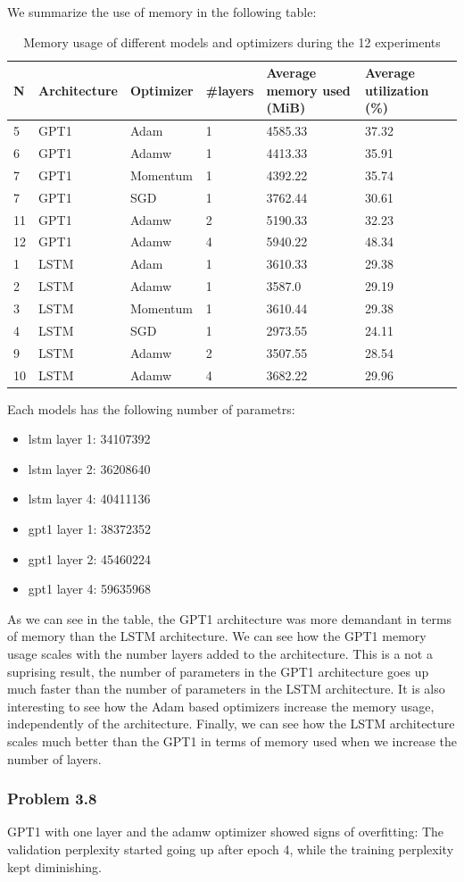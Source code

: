\documentclass[12pt]{article}
\theoremstyle{definition}
\begin{document}
We summarize the use of memory in the following table:
\begin{table}[H]
\begin{tabular}{llllll}
\hline
\multicolumn{1}{|l|}{N} & \multicolumn{1}{l|}{Architecture} & \multicolumn{1}{l|}{Optimizer} & \multicolumn{1}{l|}{\#layers} & \multicolumn{1}{l|}{Average memory used (MiB)} & \multicolumn{1}{l|}{Average utilization (\%)} \\ \hline
5 & GPT1 & Adam & 1 & 4585.33 & 37.32 \\
6 & GPT1 & Adamw & 1 & 4413.33 & 35.91 \\
7 & GPT1 & Momentum & 1 & 4392.22 & 35.74 \\
7 & GPT1 & SGD & 1 & 3762.44 & 30.61 \\
11 & GPT1 & Adamw & 2 & 5190.33 & 32.23 \\
12 & GPT1 & Adamw & 4 & 5940.22 & 48.34 \\
1 & LSTM & Adam & 1 & 3610.33 & 29.38 \\
2 & LSTM & Adamw & 1 & 3587.0 & 29.19 \\
3 & LSTM & Momentum & 1 & 3610.44 & 29.38 \\
4 & LSTM & SGD & 1 & 2973.55 & 24.11 \\
9 & LSTM & Adamw & 2 & 3507.55 & 28.54 \\
10 & LSTM & Adamw & 4 & 3682.22 & 29.96
\end{tabular}
\caption{Memory usage of different models and optimizers during the 12 experiments}
\end{table}
Each models has the following number of parametrs:
\begin{itemize}
    \item lstm layer 1: 34107392
    \item lstm layer 2: 36208640
    \item lstm layer 4: 40411136
    \item gpt1 layer 1: 38372352
    \item gpt1 layer 2: 45460224
    \item gpt1 layer 4: 59635968
\end{itemize}
As we can see in the table, the GPT1 architecture was more demandant in terms of
memory than the LSTM architecture. We can see how the GPT1 memory usage scales
with the number layers added to the architecture. This is a not a suprising
result, the number of parameters in the GPT1 architecture goes up much faster
than the number of parameters in the LSTM architecture. It is also interesting
to see how the Adam based optimizers increase the memory usage, independently of
the architecture. Finally, we can see how the LSTM architecture scales much
better than the GPT1 in terms of memory used when we increase the number of
layers.
\subsubsection*{Problem 3.8}
GPT1 with one layer and the adamw optimizer showed signs of overfitting: The
validation perplexity started going up after epoch 4, while the training
perplexity kept diminishing.
\end{document}
